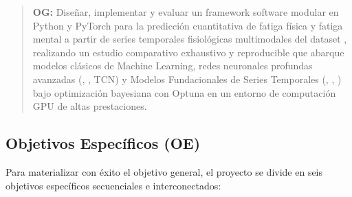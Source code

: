\begin{quote}
\textbf{OG:} Diseñar, implementar y evaluar un framework software modular en Python y PyTorch para la predicción cuantitativa de fatiga física y fatiga mental a partir de series temporales fisiológicas multimodales del dataset \fatigueset{}, realizando un estudio comparativo exhaustivo y reproducible que abarque modelos clásicos de Machine Learning, redes neuronales profundas avanzadas (\xlstm{}, \patchtst{}, TCN) y Modelos Fundacionales de Series Temporales (\moment{}, \chronos{}, \timesfm{}) bajo optimización bayesiana con Optuna en un entorno de computación GPU de altas prestaciones.
\end{quote}

\subsection{Objetivos Específicos (OE)}

Para materializar con éxito el objetivo general, el proyecto se divide en seis objetivos específicos secuenciales e interconectados:

